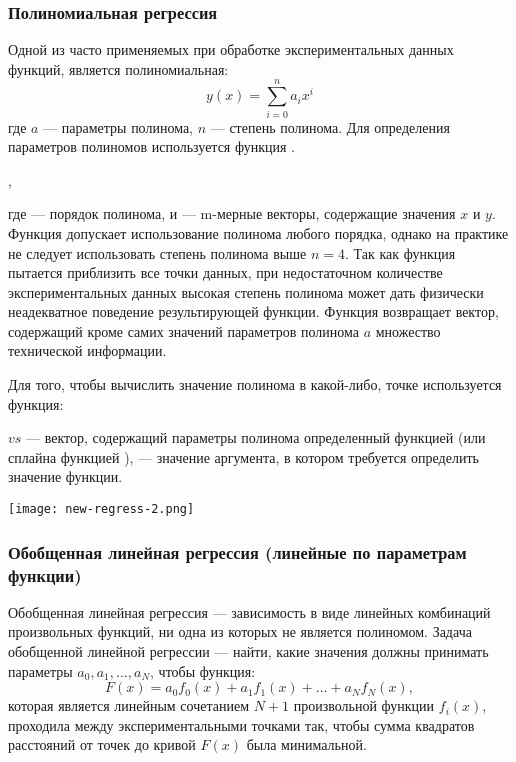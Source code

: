 \subsubsection{Полиномиальная регрессия}
Одной из  часто применяемых при обработке экспериментальных данных функций, является полиномиальная:
\begin{equation}
y(x)= \sum_{i=0}^{n} a_i x^i
\end{equation}
где $a$ --- параметры полинома, $n$ --- степень полинома. Для определения параметров полиномов используется функция .
\begin{center}
	,
\end{center}
где  --- порядок полинома,  и  --- m-мерные векторы, содержащие значения $x$ и $y$. Функция  допускает использование полинома любого порядка, однако на практике не следует использовать степень полинома выше $n = 4$. Так как функция  пытается приблизить все точки данных, при недостаточном количестве экспериментальных данных высокая степень полинома может дать физически неадекватное поведение результирующей функции. Функция  возвращает вектор, содержащий кроме самих значений параметров полинома $a$ множество технической информации. 

Для того, чтобы вычислить значение полинома в какой-либо, точке используется функция: 
\begin{center}
\end{center}
$vs$ --- вектор, содержащий параметры полинома определенный функцией  (или сплайна функцией ),  --- значение аргумента, в котором требуется определить значение функции.


\begin{center}
	\texttt{[image: new-regress-2.png]}
\end{center}


\subsubsection{Обобщенная линейная регрессия (линейные по параметрам функции)}
Обобщенная линейная регрессия --- зависимость в виде линейных комбинаций произвольных функций, ни одна из которых не является полиномом.
Задача обобщенной линейной регрессии --- найти, какие значения должны принимать параметры $a_0, a_1, ..., a_N$, чтобы функция: 
\begin{equation}
F(x)=a_0 f_0(x)+a_1 f_1(x)+ ... + a_N f_N(x),
\end{equation}
 которая является линейным сочетанием $N+1$ произвольной функции $f_i(x)$, проходила между экспериментальными точками так, чтобы сумма квадратов расстояний от точек до кривой $F(x)$ была минимальной.

